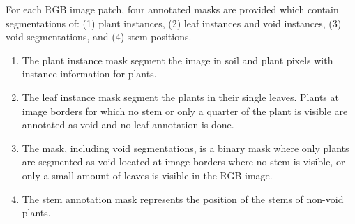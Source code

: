 \documentclass{article}
\begin{document}
For each RGB image patch, four annotated masks are provided which contain segmentations of: (1) plant instances, (2) leaf instances and void instances, (3) void segmentations, and (4) stem positions.  

\begin{enumerate}[label=(\arabic*)]
    \item The plant instance mask segment the image in soil and plant pixels with instance information for plants.
    \item The leaf instance mask segment the plants in their single leaves. Plants at image borders for which no stem or only a quarter of the plant is visible are annotated as void and no leaf annotation is done.
    \item The mask, including void segmentations, is a binary mask where only plants are segmented as void located at image borders where no stem is visible, or only a small amount of leaves is visible in the RGB image.
    \item The stem annotation mask represents the position of the stems of non-void plants.
\end{enumerate}
\end{document}
